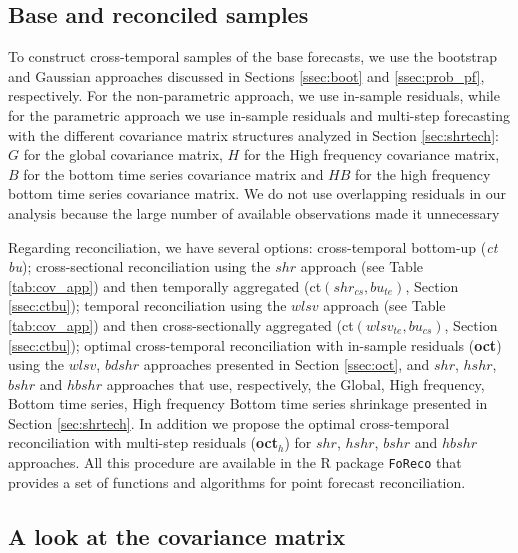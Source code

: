 \documentclass[a4paper,11pt]{article}
\theoremstyle{definition}
\begin{document}
\subsection{Base and reconciled samples}\label{ssec:sim_br}
To construct cross-temporal samples of the base forecasts, we use the bootstrap and Gaussian approaches discussed in Sections \ref{ssec:boot} and \ref{ssec:prob_pf}, respectively. For the non-parametric approach, we use in-sample residuals, while for the parametric approach we use in-sample residuals and multi-step forecasting with the different covariance matrix structures analyzed in Section \ref{sec:shrtech}: $G$ for the global covariance matrix, $H$ for the High frequency covariance matrix, $B$ for the bottom time series covariance matrix and $HB$ for the high frequency bottom time series covariance matrix. We do not use overlapping residuals in our analysis because the large number of available observations made it unnecessary %

Regarding reconciliation, we have several options: cross-temporal bottom-up (\textit{ct bu}); cross-sectional reconciliation using the $shr$ approach (see Table \ref{tab:cov_app}) and then temporally aggregated (ct$(shr_{cs}, bu_{te})$, Section \ref{ssec:ctbu});  temporal reconciliation using the $wlsv$ approach (see Table \ref{tab:cov_app}) and then cross-sectionally aggregated (ct$(wlsv_{te}, bu_{cs})$, Section \ref{ssec:ctbu}); optimal cross-temporal reconciliation \citep{difonzo2023} with in-sample residuals (\textbf{oct}) using the $wlsv$, $bdshr$ approaches presented in Section \ref{ssec:oct}, and $shr$, $hshr$, $bshr$ and $hbshr$ approaches that use, respectively, the Global, High frequency, Bottom time series, High frequency Bottom time series shrinkage presented in Section \ref{sec:shrtech}. In addition we propose the optimal cross-temporal reconciliation with multi-step residuals (\textbf{oct$_h$}) for $shr$, $hshr$, $bshr$ and $hbshr$ approaches. All this procedure are available in the \textsf{R} package \texttt{FoReco} \citep{girolimetto2022} that provides a set of functions and algorithms for point forecast reconciliation. 

\subsection{A look at the covariance matrix}
\end{document}

